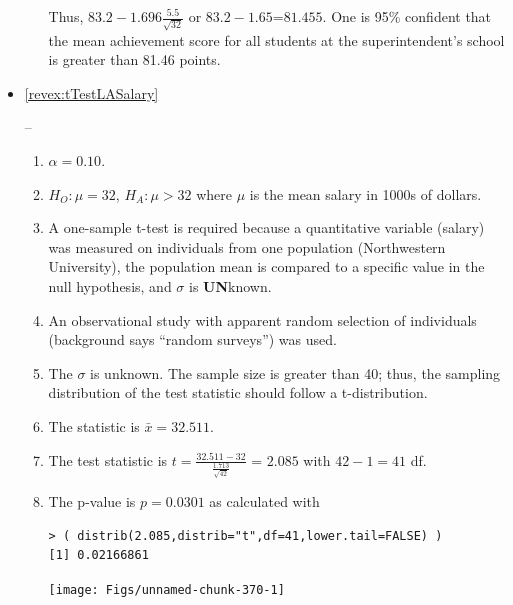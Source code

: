 \documentclass[10pt,openany]{book}\usepackage[]{graphicx}\usepackage[]{color}
\makeatletter
\newenvironment{kframe}{%
 \def\at@end@of@kframe{}%
 \ifinner\ifhmode%
  \def\at@end@of@kframe{\end{minipage}}%
  \begin{minipage}{\columnwidth}%
 \fi\fi%
 \def\FrameCommand##1{\hskip\@totalleftmargin \hskip-\fboxsep
 \colorbox{shadecolor}{##1}\hskip-\fboxsep
     \hskip-\linewidth \hskip-\@totalleftmargin \hskip\columnwidth}%
 \MakeFramed {\advance\hsize-\width
   \@totalleftmargin\z@ \linewidth\hsize
   \@setminipage}}%
 {\par\unskip\endMakeFramed%
 \at@end@of@kframe}
\newenvironment{knitrout}{}{} %
\makeatother
\begin{document}
\begin{itemize}
\begin{enumerate}
\begin{knitrout}
\end{knitrout}
Thus, $83.2-1.696\frac{5.5}{\sqrt{32}}$ or $83.2-1.65$=$81.455$.  One is 95\% confident that the mean achievement score for all students at the superintendent's school is greater than 81.46 points.
    \end{enumerate}
  \item \hypertarget{ans:tTestLASalary}{\ref{revex:tTestLASalary}} --
    \begin{enumerate}
      \item $\alpha=0.10$.
      \item $H_{O}:\mu=32$, $H_{A}:\mu>32$ where $\mu$ is the mean salary in 1000s of dollars.
      \item A one-sample t-test is required because a quantitative variable (salary) was measured on individuals from one population (Northwestern University), the population mean is compared to a specific value in the null hypothesis, and $\sigma$ is \textbf{UN}known.
      \item An observational study with apparent random selection of individuals (background says ``random surveys'') was used.
      \item The $\sigma$ is unknown.  The sample size is greater than 40; thus, the sampling distribution of the test statistic should follow a t-distribution.
      \item The statistic is $\bar{x}=32.511$.
      \item The test statistic is $t=\frac{32.511-32}{\frac{1.713}{\sqrt{42}}}$ = $2.085$ with $42-1=41$ df.
      \item The p-value is $p=0.0301$ as calculated with
\begin{knitrout}
\color{fgcolor}\begin{kframe}
\begin{verbatim}
> ( distrib(2.085,distrib="t",df=41,lower.tail=FALSE) )
[1] 0.02166861
\end{verbatim}
\end{kframe}

{\centering \texttt{[image: Figs/unnamed-chunk-370-1]} 

}




\end{knitrout}
\end{enumerate}
\end{itemize}
\end{document}
